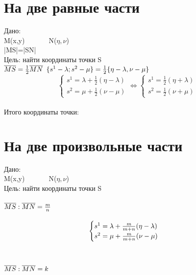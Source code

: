 \documentclass{book}
\begin{document}
\section{На две равные части}
Дано:\\
M(x,y)\ \ \ \ \ \ \ N($\eta,\nu$)\\
|MS|=|SN|\\
Цель: найти координаты точки S\\
$\overline{MS}=\frac{1}{2}\overline{MN}\\$
$\{s^1-\lambda;s^2-\mu\}=\frac{1}{2}\{\eta-\lambda,\nu-\mu\}\\$
\begin{equation}
    \begin{cases}
      s^1=\lambda+\frac{1}{2}(\eta-\lambda)\\
      s^2=\mu+\frac{1}{2}(\nu-\mu)
    \end{cases}
\Leftrightarrow
    \begin{cases}
        s^1=\frac{1}{2}(\eta+\lambda)\\
        s^2=\frac{1}{2}(\nu+\mu)
      \end{cases}
\end{equation}\\
Итого координаты точки:
\section{На две произвольные части}
Дано:\\
M(x,y)\ \ \ \ \ \ \ N($\eta,\nu$)\\
Цель: найти координаты точки S\\
\paragraph{$\overline{MS}:\overline{MN}=\frac{m}{n}\\$}
\begin{equation}
    \centering
    \begin{cases}
      s^1=\lambda+\frac{m}{m+n}(\eta-\lambda)\\
      s^2=\mu+\frac{m}{m+n}(\nu-\mu)
    \end{cases}
\end{equation}\\
\paragraph{$\overline{MS}:\overline{MN}=k\\$}
\\
\end{document}
